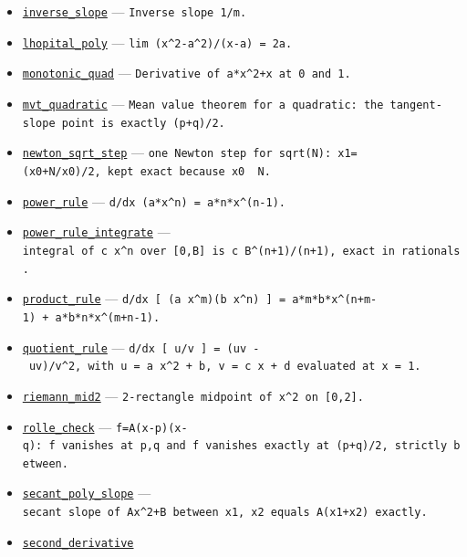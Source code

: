 \documentclass[
  10pt,
]{article}
\begin{document}
\begin{itemize}
  \href{../generation_1/I1/algos_gen1_big.py}{\texttt{inflection\_cubic}}
  --- \texttt{x\^{}3+b*x\ inflects\ at\ 0.}
\item
  \href{../generation_1/I1/algos_gen1_big.py}{\texttt{inverse\_slope}}
  --- \texttt{Inverse\ slope\ 1/m.}
\item
  \href{../generation_1/I1/algos_gen1_big.py}{\texttt{lhopital\_poly}}
  --- \texttt{lim\ (x\^{}2-a\^{}2)/(x-a)\ =\ 2a.}
\item
  \href{../generation_1/I1/algos_gen1_big.py}{\texttt{monotonic\_quad}}
  --- \texttt{Derivative\ of\ a*x\^{}2+x\ at\ 0\ and\ 1.}
\item
  \href{../generation_1/I3/algos_i3.py}{\texttt{mvt\_quadratic}} ---
  \texttt{Mean\ value\ theorem\ for\ a\ quadratic:\ the\ tangent-slope\ point\ is\ exactly\ (p+q)/2.}
\item
  \href{../generation_1/I3/algos_i3.py}{\texttt{newton\_sqrt\_step}} ---
  \texttt{one\ Newton\ step\ for\ sqrt(N):\ x1=(x0+N/x0)/2,\ kept\ exact\ because\ x0\ \textbar{}\ N.}
\item
  \href{../tools/prm/algos.py}{\texttt{power\_rule}} ---
  \texttt{d/dx\ (a*x\^{}n)\ =\ a*n*x\^{}(n-1).}
\item
  \href{../generation_1/I3/algos_i3.py}{\texttt{power\_rule\_integrate}}
  ---
  \texttt{integral\ of\ c\ x\^{}n\ over\ {[}0,B{]}\ is\ c\ B\^{}(n+1)/(n+1),\ exact\ in\ rationals.}
\item
  \href{../tools/prm/algos.py}{\texttt{product\_rule}} ---
  \texttt{d/dx\ {[}\ (a\ x\^{}m)(b\ x\^{}n)\ {]}\ =\ a*m*b*x\^{}(n+m-1)\ +\ a*b*n*x\^{}(m+n-1).}
\item
  \href{../tools/prm/algos.py}{\texttt{quotient\_rule}} ---
  \texttt{d/dx\ {[}\ u/v\ {]}\ =\ (u\textquotesingle{}v\ -\ uv\textquotesingle{})/v\^{}2,\ with\ u\ =\ a\ x\^{}2\ +\ b,\ v\ =\ c\ x\ +\ d\ evaluated\ at\ x\ =\ 1.}
\item
  \href{../generation_1/I1/algos_gen1_big.py}{\texttt{riemann\_mid2}}
  --- \texttt{2-rectangle\ midpoint\ of\ x\^{}2\ on\ {[}0,2{]}.}
\item
  \href{../generation_1/I3/algos_i3.py}{\texttt{rolle\_check}} ---
  \texttt{f=A(x-p)(x-q):\ f\ vanishes\ at\ p,q\ and\ f\textquotesingle{}\ vanishes\ exactly\ at\ (p+q)/2,\ strictly\ between.}
\item
  \href{../generation_1/I3/algos_i3.py}{\texttt{secant\_poly\_slope}}
  ---
  \texttt{secant\ slope\ of\ Ax\^{}2+B\ between\ x1,\ x2\ equals\ A(x1+x2)\ exactly.}
\item
  \href{../generation_1/I1/algos_gen1_big.py}{\texttt{second\_derivative}}

\end{itemize}
\end{document}
